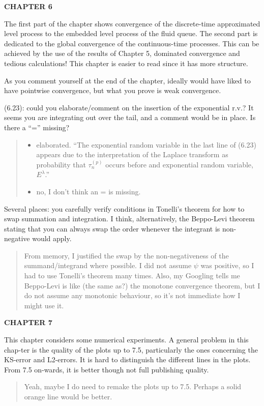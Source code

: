 \documentclass[a4paper]{article}
\begin{document}
\noindent\textbf{CHAPTER 6}

The first part of the chapter shows convergence of the discrete-time approximated level process to the embedded level process of the fluid queue. The second part is dedicated to the global convergence of the continuous-time processes. This can be achieved by the use of the results of Chapter 5, dominated convergence and tedious calculations! This chapter is easier to read since it has more structure.

As you comment yourself at the end of the chapter, ideally would have liked to have pointwise convergence, but what you prove is weak convergence.

(6.23): could you elaborate/comment on the insertion of the exponential r.v.? It seems you are integrating out over the tail, and a comment would be in place. Is there a “=” missing?
\begin{quote}
    \begin{itemize}
        \item elaborated. ``The exponential random variable in the last line of (6.23) appears due to the interpretation of the Laplace transform as probability that \(\tau_n^{(p)}\) occurs before and exponential random variable, \(E^\lambda\).''
        \item no, I don't think an = is missing.
    \end{itemize}
\end{quote}

Several places: you carefully verify conditions in Tonelli’s theorem for how to swap summation and integration. I think, alternatively, the Beppo-Levi theorem stating that you can always swap the order whenever the integrant is non-negative would apply.
\begin{quote}
    From memory, I justified the swap by the non-negativeness of the summand/integrand where possible. I did not assume \(\psi\) was positive, so I had to use Tonelli's theorem many times. Also, my Googling tells me Beppo-Levi is like (the same as?) the monotone convergence theorem, but I do not assume any monotonic behaviour, so it's not immediate how I might use it. 
\end{quote}


\noindent\textbf{CHAPTER 7}

This chapter considers some numerical experiments. A general problem in this chap-ter is the quality of the plots up to 7.5, particularly the ones concerning the KS-error and L2-errors. It is hard to distinguish the different lines in the plots. From 7.5 on-wards, it is better though not full publishing quality.
\begin{quote}
    Yeah, maybe I do need to remake the plots up to 7.5. Perhaps a solid orange line would be better. 
\end{quote}
\end{document}
